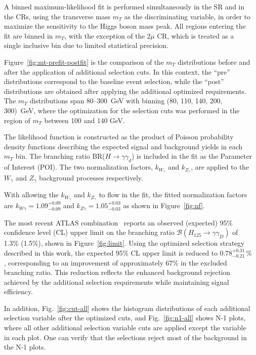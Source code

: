 A binned maximum-likelihood fit is performed simultaneously in the SR and in the CRs, using the transverse mass $m_T$ as the discriminating variable, in order to maximize the sensitivity to the Higgs boson mass peak. All regions entering the fit are binned in $m_{T}$, with the exception of the 2$\mu$ CR, which is treated as a single inclusive bin due to limited statistical precision.

Figure~\ref{fig:mt-prefit-postfit} is the comparison of the $m_T$ distributions before and after the application of additional selection cuts. In this context, the ``pre'' distributions correspond to the baseline event selection, while the ``post'' distributions are obtained after applying the additional optimized requirements.
The $m_T$ distributions span $80$--$300$~GeV with binning (80, 110, 140, 200, 300)~GeV, where the optimization for the selection cuts was performed in the region of $m_T$ between 100 and 140 GeV. 

The likelihood function is constructed as the product of Poisson probability density functions describing the expected signal and background yields in each $m_T$ bin. The branching ratio BR($H\to\gamma\gamma_d$) is included in the fit as the Parameter of Interest (POI). The two normalization factors, $k_{W_{\gamma}}$ and $k_{Z_{\gamma}}$, are applied to the $W_\gamma$ and $Z_\gamma$ background processes respectively. 

With allowing the $k_{W_{\gamma}}$ and $k_{Z_{\gamma}}$ to flow in the fit, the fitted normalization factors are $k_{W\gamma} = 1.09^{+0.09}_{-0.09}$ and
$k_{Z\gamma} = 1.05^{+0.03}_{-0.03}$ as shown in Figure~\ref{fig:nf}. 

The most recent ATLAS combination~\cite{ATLAS:2024hpd} reports an observed (expected) 
95\% confidence level (CL) upper limit on the branching ratio 
$\mathcal{B}(H_{125} \rightarrow \gamma\gamma_D)$ of 1.3\% (1.5\%), shown in Figure~\ref{fig:limit}.
Using the optimized selection strategy described in this work, the expected 95\% CL upper limit is reduced to $0.78^{+0.31}_{-0.21}\,\%$, corresponding to an improvement of approximately 67\% in the excluded branching ratio.
This reduction reflects the enhanced background rejection achieved by the 
additional selection requirements while maintaining signal efficiency. 

In addition, Fig.~\ref{fig:cut-all} shows the histogram distributions of each additional selection variable after the optimized cuts, and Fig.~\ref{fig:n1-all} shows N-1 plots, where all other additional selection variable cuts are applied except the variable in each plot. One can verify that the selections reject most of the background in the N-1 plots.



